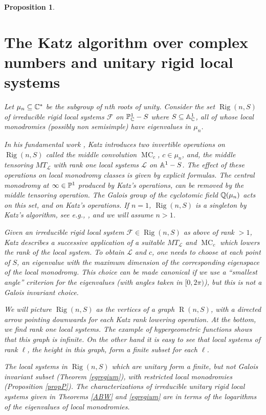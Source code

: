 \documentclass[11pt]{amsart}
\newcommand\op{\operatorname}
\newcommand\mf{\mathcal{F}}
\newcommand\ml{\mathcal{L}}
\newtheorem{proposition}[theorem]{Proposition}
\numberwithin{theorem}{subsection}
\begin{document}
{\begin{proposition}
\section{The Katz algorithm over complex numbers and unitary rigid local systems}\label{earlyfeedback}
Let $\mu_n\subseteq\Bbb{C}^*$ be the subgroup of $n$th roots of unity. Consider the set $\op{Rig}(n,S)$ of irreducible rigid local systems $\mf$ on $\Bbb{P}^1_{\Bbb{C}}-S$ where $S\subseteq \Bbb{A}_{\Bbb{C}}^1$, all of whose local monodromies (possibly non semisimple) have eigenvalues in $\mu_n$.

In his fundamental work \cite{Katz}, Katz introduces two invertible operations on $\op{Rig}(n,S)$ called the middle convolution $\op{MC}_{c}$, $c\in \mu_n$, and, the middle  tensoring $MT_{\mathcal{L}}$ with rank one local systems $\ml$ on $\Bbb{A}^1-S$.  The effect of these operations on local monodromy classes  is given by explicit formulas. The central monodromy at $\infty\in \Bbb{P}^1$ produced by Katz's operations,  can be removed by the middle tensoring operation. The Galois group of the cyclotomic field $\Bbb{Q}(\mu_n)$ acts on this set, and on Katz's operations. If $n=1$,   $\op{Rig}(n,S)$  is a singleton by Katz's algorithm, see  e.g., \cite[Proof of Theorem 9.15]{MM}, and we will assume $n>1$.


Given an irreducible rigid local system $\mf\in \op{Rig}(n,S)$ as above of rank $>1$, Katz \cite{Katz} describes a successive application of a suitable $MT_{\mathcal{L}}$ and $\op{MC}_{c}$ which lowers the rank of the  local system. To obtain $\mathcal{L}$ and $c$, one needs to choose at each point of $S$, an eigenvalue with  the maximum dimension of the corresponding eigenspace of the local monodromy. This choice can be made canonical if we use a ``smallest angle'' criterion for  the eigenvalues  (with angles taken in $[0,2\pi)$), but this is not a Galois invariant choice.

We will picture $\op{Rig}(n,S)$  as the vertices of a graph  $\op{R}(n,S)$, with a directed arrow pointing downwards for each Katz rank lowering operation.  At the bottom, we find rank one local systems. The example of hypergeometric functions
 \cite[Theorem 3.5]{BH} shows that this graph is infinite. On the other hand it is easy to see that local systems of rank $\ell$, the height in this graph, form a finite subset for each $\ell$.

 The local systems in $\op{Rig}(n,S)$  which are unitary form a   finite, but not Galois invariant subset (Theorem \ref{egregium}), with restricted local monodromies (Proposition \ref{propP}). The characterizations of irreducible unitary rigid local systems given in Theorems \ref{ABW} and \ref{egregium} are  in terms  of the logarithms of the eigenvalues of local monodromies.




\end{proposition}}
\end{document}
